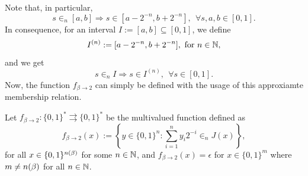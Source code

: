 Note that, in particular,
\begin{equation}
    s \in_n [a,b] \Rightarrow s \in [a - 2^{-n}, b + 2^{-n}], \ \ \forall s,a,b \in [0,1].
\end{equation}
In consequence, for an interval $I := [a,b] \subseteq [0,1]$, we define 
\begin{equation}\label{eq:definition of superset of size 2 -n more}
    I^{(n)} := [a - 2^{-n}, b + 2^{-n}], \ \text{for} \ n \in \mathbb{N},
\end{equation}
and we get 
\begin{equation}\label{eq:finite precision membership up to 2 -n implies membership to a superset of size 2 -n more}
    s \in_n I \Rightarrow s \in I^{(n)}, \ \ \forall s \in [0,1].
\end{equation}
Now, the function $f_{\beta \to 2}$ can simply be defined with the usage of this approxiamte membership relation.
\begin{definition}\label{def:multivalued function converting from base beta to base 2}
    Let $f_{\beta \to 2} : \{0,1\}^\ast \rightrightarrows \{0,1\}^\ast$ be the multivalued function defined as 
\begin{equation}\label{eq:main:def:multivalued function converting from base beta to base 2}
    f_{\beta \to 2}(x) := \left\{ y \in \{0,1\}^n :  \sum_{i=1}^{n} y_i 2^{-i} \in_n J(x)\right\},
\end{equation}
for all $x \in \{0,1\}^{n(\beta)}$ for some $n \in \mathbb{N}$, and $f_{\beta \to 2}(x) = \epsilon$ for $x \in \{0,1\}^m$ where $m \neq n(\beta)$ for all $n \in \mathbb{N}$.
\end{definition} 



